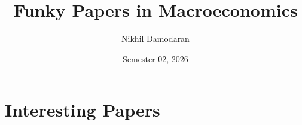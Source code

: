 \documentclass[12pt]{article}
\title{Funky Papers in Macroeconomics}
\date{Semester 02, 2026}
\author{Nikhil Damodaran}
\begin{document}
\maketitle


\section{Interesting Papers}

\cite{Hayek1989AER}

\cite{Hayek1945AER}














\clearpage
\begingroup
\footnotesize
\setlength{\bibsep}{0.2em}


\endgroup
\end{document}
